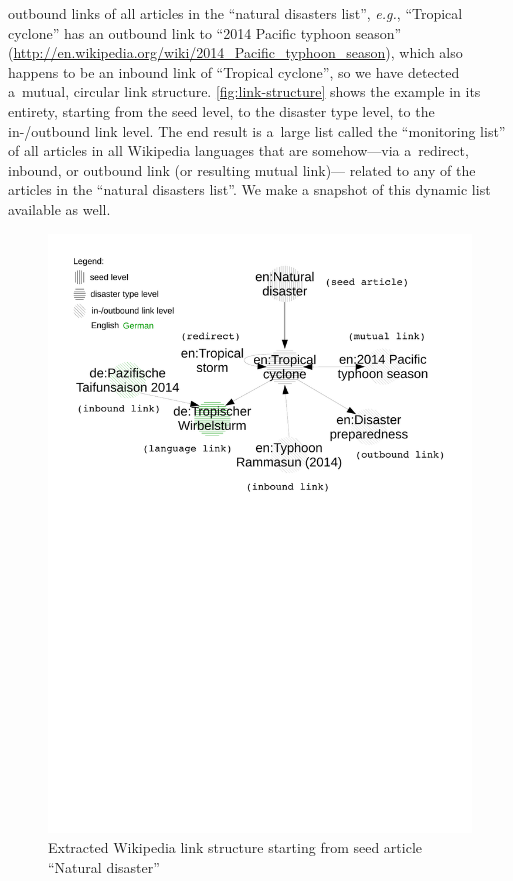 \documentclass[runningheads,a4paper]{llncs}
\begin{document}
outbound links of all articles in the ``natural disasters list'',
\emph{e.g.}, ``Tropical cyclone'' has an outbound link to
``2014 Pacific typhoon season''
(\url{http://en.wikipedia.org/wiki/2014_Pacific_typhoon_season}),
which also happens to be an inbound link of ``Tropical cyclone'',
so we have detected a~mutual, circular link structure.
\autoref{fig:link-structure} shows the example in its entirety,
starting from the seed level, to the disaster type level, to the in-/outbound link level.
The end result is a~large list called the ``monitoring list''
of all articles in all Wikipedia languages
that are somehow---via a~redirect, inbound, or outbound link (or resulting mutual link)---%
related to any of the articles
in the ``natural disasters list''.
We make a snapshot of this dynamic list available as well.

\begin{figure}[hbt]
  \includegraphics[trim=0mm 165mm 0mm 10mm,clip,width=\linewidth]{link-structure}
  \caption{Extracted Wikipedia link structure starting from seed article ``Natural disaster''}
  \label{fig:link-structure}
\end{figure}
\end{document}
